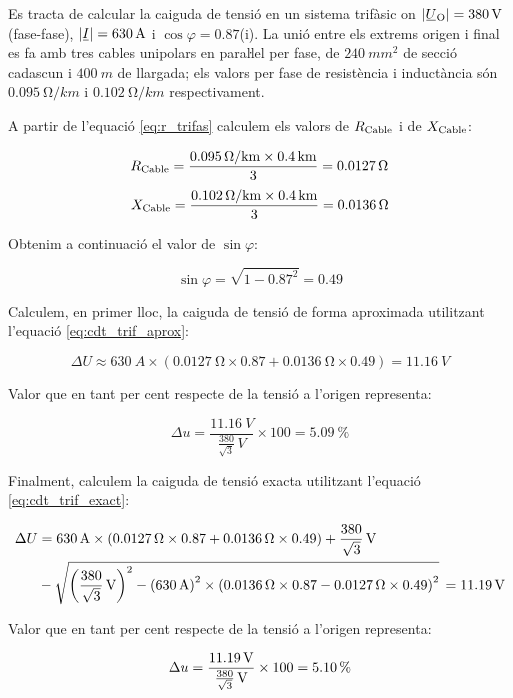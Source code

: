\begin{exemple}\label{ex:CaigudaDeTensio}
	\addcontentsxms{\CaigudaDeTensio}
       Es tracta de calcular la caiguda de tensió en un sistema trifàsic on $|\cmplx{U}\ped{O}| = \qty{380}{V}$ (fase-fase), $|\cmplx{I}|=\qty{630}{A}$ i $\cos \varphi = \num{0,87}$(i). La unió entre els extrems origen  i final es fa amb tres cables unipolars en paraŀlel per fase, de $\qty{240}{mm^2}$ de secció cadascun i $\qty{400}{m}$ de llargada; els valors per fase de resistència i inductància són $\qty{0,095}{\ohm/km}$ i $\qty{0,102}{\ohm/km}$ respectivament.

    A partir de l'equació \eqref{eq:r_trifas} calculem els valors de $R_\mathrm{Cable}$ i de $X_\mathrm{Cable}$:

    \[
       R_\mathrm{Cable} = \frac{\qty{0,095}{\ohm/km}\times \qty{0,4}{km}}{3} = \qty{0,0127}{\ohm}
    \]
    \[
       X_\mathrm{Cable} = \frac{\qty{0,102}{\ohm/km}\times \qty{0,4}{km}}{3} = \qty{0,0136}{\ohm}
    \]

    Obtenim a continuació el valor de $\sin \varphi$:

    \[
       \sin \varphi = \sqrt{1-\num{0,87}^2} = \num{0,49}
    \]

    Calculem, en primer lloc, la caiguda de tensió de forma aproximada utilitzant l'equació \eqref{eq:cdt_trif_aprox}:

    \[
       \Delta U \approx \qty{630}{A} \times ( \qty{0,0127}{\ohm} \times \num{0,87} + \qty{0,0136}{\ohm} \times \num{0,49} ) = \qty{11,16}{V}
    \]

    Valor que en tant per cent respecte de la tensió a l'origen representa:

    \[
        \Delta u = \frac{\qty{11,16}{V}}{\frac{380}{\sqrt{3}}\unit{\,V}} \times 100 = \qty{5,09}{\percent}
    \]

    Finalment, calculem la caiguda de tensió exacta utilitzant l'equació \eqref{eq:cdt_trif_exact}:

    \[ \begin{split}
       \Delta U &=  \qty{630}{A} \times( \qty{0,0127}{\ohm} \times \num{0,87} + \qty{0,0136}{\ohm} \times \num{0,49}) + \qty[parse-numbers = false]{\frac{380}{\sqrt{3}}}{V}  \\
        &- \sqrt{\left(\qty[parse-numbers = false]{\frac{380}{\sqrt{3}}}{V}\right)^2 - \left(\qty{630}{A}\right)^2 \times  \left( \qty{0,0136}{\ohm} \times \num{0,87} - \qty{0,0127}{\ohm} \times \num{0,49} \right)^2 } \,= \qty{11,19}{V}
    \end{split} \]

    Valor que en tant per cent respecte de la tensió a l'origen representa:

    \[
        \Delta u = \frac{\qty{11,19}{V}}{\qty[parse-numbers = false]{\frac{380}{\sqrt{3}}}{V}} \times 100 = \qty{5,10}{\percent}
    \]
\end{exemple}

